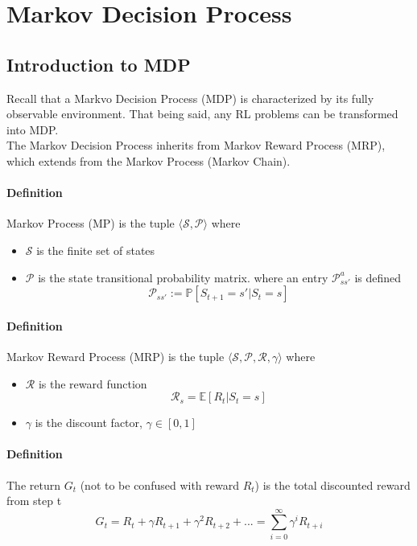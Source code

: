
\section{Markov Decision Process}
	\subsection{Introduction to MDP}
	Recall that a Markvo Decision Process (MDP) is characterized by its fully observable environment. That being said, any RL problems can be transformed into MDP. \\
	The Markov Decision Process inherits from Markov Reward Process (MRP), which extends from the Markov Process (Markov Chain). 
	\paragraph{Definition} Markov Process (MP) is the tuple $ \langle \mathcal{S, P} \rangle $ where 
	\begin{itemize}
	\item $\mathcal{S}$ is the finite set of states
	\item $\mathcal{P}$ is the state transitional probability matrix. where an entry $\mathcal{P}^a_{ss'}$ is defined
	\begin{equation*}
	\mathcal{P}_{ss'} := \mathbb{P}[S_{t+1} = s' | S_t = s] 
	\end{equation*}
	\end{itemize}

	\paragraph{Definition} Markov Reward Process (MRP) is the tuple $ \langle \mathcal{S, P, R, \gamma} \rangle$ where 
	\begin{itemize}
	\item $\mathcal{R}$ is the reward function 
	\begin{equation*}
	\mathcal{R}_s = \mathbb{E}[R_t | S_t = s]
	\end{equation*}
	\item $\gamma$ is the discount factor, $\gamma \in [0,1]$
	\end{itemize}

	\paragraph{Definition} The return $G_t$ (not to be confused with reward $R_t$) is the total discounted reward from step t
	\begin{equation*}
	G_t = R_t + \gamma R_{t+1} + \gamma^2 R_{t+2} + ... = \sum^\infty_{i=0} \gamma^i R_{t+i}
	\end{equation*}

